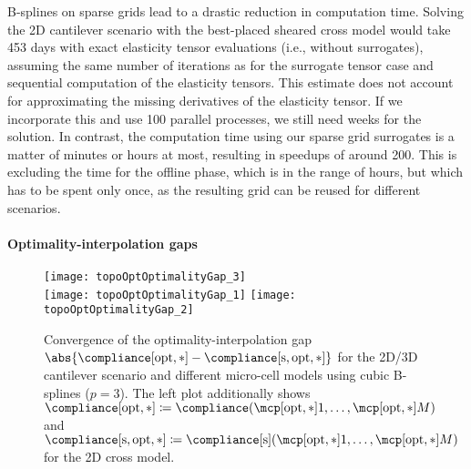 B-splines on sparse grids lead to a drastic reduction in computation time.
Solving the 2D cantilever scenario with the best-placed sheared cross model
would take 453 days with
exact elasticity tensor evaluations (i.e., without surrogates),
assuming the same number of iterations as for the surrogate tensor case
and sequential computation of the elasticity tensors.
This estimate does not account for approximating the missing derivatives
of the elasticity tensor.
If we incorporate this and use 100 parallel processes,
we still need weeks for the solution.
In contrast, the computation time using our sparse grid surrogates
is a matter of minutes or hours at most,
resulting in speedups of around 200.
This is excluding the time for the offline phase,
which is in the range of hours, but which has to be spent only once,
as the resulting grid can be reused for different scenarios.

\vspace{2em}

\paragraph{Optimality-interpolation gaps}

\begin{figure}
  \texttt{[image: topoOptOptimalityGap\_3]}%
  \\[2mm]%
  \texttt{[image: topoOptOptimalityGap\_1]}%
  \hfill%
  \texttt{[image: topoOptOptimalityGap\_2]}%
  \caption[Convergence of the optimality-interpolation gap]{%
    Convergence of the optimality-interpolation gap
    $\abs{\compliance[\opt,\ast] - \complianceintp[\opt,\ast]}$
    for the 2D/3D cantilever scenario
    and different micro-cell models using cubic B-splines ($p = 3$).
    The left plot additionally shows
    $\compliance[\opt,\ast]
    \ceq \compliance(\mcpoptappr{1}, \dotsc, \mcpoptappr{M})$ and
    $\complianceintp[\opt,\ast]
    \ceq \complianceintp(\mcpoptappr{1}, \dotsc, \mcpoptappr{M})$
    for the 2D cross model.%
  }%
  \label{fig:topoOptOptimalityGap}%
\end{figure}

